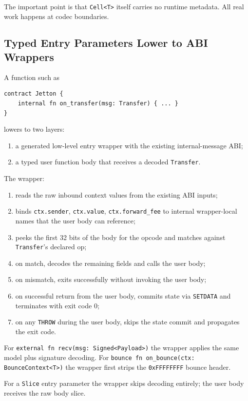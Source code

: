 \documentclass[12pt,oneside]{article}
\begin{document}
The important point is that \verb|Cell<T>| itself carries no runtime metadata.
All real work happens at codec boundaries.

\subsection{Typed Entry Parameters Lower to ABI Wrappers}
\label{sec:typed-entry-lowering}
A function such as

\begin{verbatim}
contract Jetton {
    internal fn on_transfer(msg: Transfer) { ... }
}
\end{verbatim}

lowers to two layers:

\begin{enumerate}
\item a generated low-level entry wrapper with the existing
internal-message ABI;
\item a typed user function body that receives a decoded \verb|Transfer|.
\end{enumerate}

The wrapper:

\begin{enumerate}
\item reads the raw inbound context values from the existing ABI inputs;
\item binds \verb|ctx.sender|, \verb|ctx.value|, \verb|ctx.forward_fee|
to internal wrapper-local names that the user body can reference;
\item peeks the first 32 bits of the body for the opcode and matches
against \verb|Transfer|'s declared op;
\item on match, decodes the remaining fields and calls the user body;
\item on mismatch, exits successfully without invoking the user body;
\item on successful return from the user body, commits state via
\verb|SETDATA| and terminates with exit code 0;
\item on any \verb|THROW| during the user body, skips the state commit
and propagates the exit code.
\end{enumerate}

For \verb|external fn recv(msg: Signed<Payload>)| the wrapper applies
the same model plus signature decoding. For
\verb|bounce fn on_bounce(ctx: BounceContext<T>)| the wrapper first
strips the \verb|0xFFFFFFFF| bounce header.

For a \verb|Slice| entry parameter the wrapper skips decoding entirely;
the user body receives the raw body slice.
\end{document}
